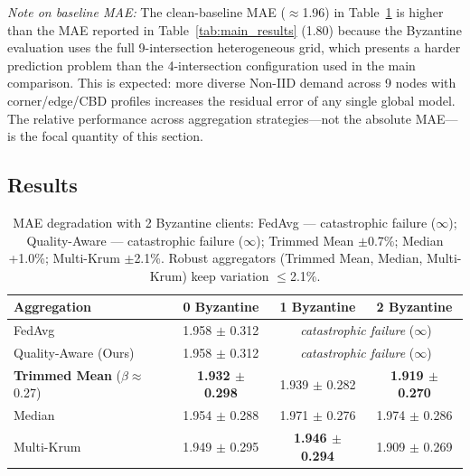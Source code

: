 \documentclass[conference]{IEEEtran}
\begin{document}
\textit{Note on baseline MAE:} The clean-baseline MAE ($\approx$1.96) in Table~\ref{tab:byzantine} is higher than the MAE reported in Table~\ref{tab:main_results} (1.80) because the Byzantine evaluation uses the full 9-intersection heterogeneous grid, which presents a harder prediction problem than the 4-intersection configuration used in the main comparison. This is expected: more diverse Non-IID demand across 9 nodes with corner/edge/CBD profiles increases the residual error of any single global model. The relative performance across aggregation strategies—not the absolute MAE—is the focal quantity of this section.

\subsection{Results}

\begin{table}[htbp]
\caption{Byzantine Robustness: MAE (mean $\pm$ std) Under Sensor-Noise Attacks. \textbf{Bold} = best per column.}
\label{tab:byzantine}
\centering
\begin{tabular}{lccc}
\toprule
\textbf{Aggregation} & \textbf{0 Byzantine} & \textbf{1 Byzantine} & \textbf{2 Byzantine} \\
\midrule
FedAvg                             & 1.958 $\pm$ 0.312 & \multicolumn{2}{c}{\textit{catastrophic failure} ($\infty$)} \\
Quality-Aware (Ours)               & 1.958 $\pm$ 0.312 & \multicolumn{2}{c}{\textit{catastrophic failure} ($\infty$)} \\
\textbf{Trimmed Mean} ($\beta$$\approx$0.27) & \textbf{1.932 $\pm$ 0.298} & 1.939 $\pm$ 0.282 & \textbf{1.919 $\pm$ 0.270} \\
Median                             & 1.954 $\pm$ 0.288 & 1.971 $\pm$ 0.276 & 1.974 $\pm$ 0.286 \\
Multi-Krum                         & 1.949 $\pm$ 0.295 & \textbf{1.946 $\pm$ 0.294} & 1.909 $\pm$ 0.269 \\
\bottomrule
\end{tabular}
\vspace{1mm}
\caption*{\footnotesize MAE degradation with 2 Byzantine clients: FedAvg — catastrophic failure ($\infty$); Quality-Aware — catastrophic failure ($\infty$); Trimmed Mean $\pm$0.7\%; Median +1.0\%; Multi-Krum $\pm$2.1\%. Robust aggregators (Trimmed Mean, Median, Multi-Krum) keep variation $\leq$2.1\%.}
\end{table}
\end{document}
